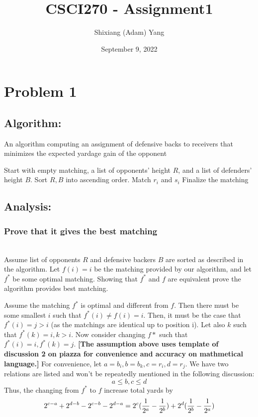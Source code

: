 \documentclass{article}
\author{Shixiang (Adam) Yang}
\date{September 9, 2022}
\title{CSCI270 - Assignment1}
\begin{document}
 \maketitle
\section{Problem 1}
    \subsection{Algorithm: }
    \begin{algorithm}
    \caption{An algorithm computing an assignment of defensive backs to receivers that minimizes the expected yardage gain of the opponent}\label{alg:cap}
    \begin{algorithmic}
    
    \State Start with empty matching, a list of opponents' height $R$, and a list of defenders' height $B$.
    \State Sort $R, B$ into ascending order.
        \State Match $r_i$ and $s_i$
    \EndFor
    \State Finalize the matching
    \end{algorithmic}
    \end{algorithm}


    \subsection{Analysis:}
        \subsubsection{Prove that it gives the best matching} 
        \\
         Assume list of opponents $R$ and defensive backers $B$ are sorted as described in the algorithm. Let $f(i)=i$ be the matching provided by our algorithm, and let $f^*$ be some optimal matching. Showing that $f^*$ and $f$ are equivalent prove the algorithm provides best matching.
        
        Assume the matching $f^*$ is optimal and different from $f$. Then there must be some smallest $i$ such that $f^*(i) \neq f(i) = i$. Then, it must be the case that $f^*(i) = j > i$ (as the matchings are identical up to position i). Let also $k$ such that $f^*(k) = i, k > i$. Now consider changing $f*$ such that $f^*(i)=i, f^*(k)=j$. \textbf{[The assumption above uses template of discussion 2 on piazza for convenience and accuracy on mathmetical language.]} 
        For convenience, let $a=b_i, b=b_k, c=r_i, d=r_j$. We have two relations are listed and won't be repeatedly mentioned in the following discussion:
        \[a\leq b, c\leq d \]
        \indent Thus, the changing from $f^*$ to $f$ increase total yards by
        \[2^{c-a}+2^{d-b}-2^{c-b}-2^{d-a}\\
        =2^c(\frac{1}{2^a}-\frac{1}{2^b})+2^d(\frac{1}{2^b}-\frac{1}{2^a})
        \]
\end{document}
